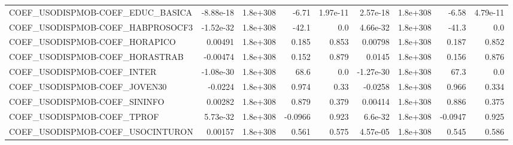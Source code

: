 \begin{tabular}{lrrrrrrrr}
COEF\_USODISPMOB-COEF\_EDUC\_BASICA  &   -8.88e-18 &     1.8e+308 &     -6.71 & 1.97e-11 &   2.57e-18 &    1.8e+308 &        -6.58 &      4.79e-11 \\
COEF\_USODISPMOB-COEF\_HABPROSOCF3  &   -1.52e-32 &     1.8e+308 &     -42.1 &      0.0 &   4.66e-32 &    1.8e+308 &        -41.3 &           0.0 \\
COEF\_USODISPMOB-COEF\_HORAPICO     &     0.00491 &     1.8e+308 &     0.185 &    0.853 &    0.00798 &    1.8e+308 &        0.187 &         0.852 \\
COEF\_USODISPMOB-COEF\_HORASTRAB    &    -0.00474 &     1.8e+308 &     0.152 &    0.879 &     0.0145 &    1.8e+308 &        0.156 &         0.876 \\
COEF\_USODISPMOB-COEF\_INTER        &   -1.08e-30 &     1.8e+308 &      68.6 &      0.0 &  -1.27e-30 &    1.8e+308 &         67.3 &           0.0 \\
COEF\_USODISPMOB-COEF\_JOVEN30      &     -0.0224 &     1.8e+308 &     0.974 &     0.33 &    -0.0258 &    1.8e+308 &        0.966 &         0.334 \\
COEF\_USODISPMOB-COEF\_SININFO      &     0.00282 &     1.8e+308 &     0.879 &    0.379 &    0.00414 &    1.8e+308 &        0.886 &         0.375 \\
COEF\_USODISPMOB-COEF\_TPROF        &    5.73e-32 &     1.8e+308 &   -0.0966 &    0.923 &    6.6e-32 &    1.8e+308 &      -0.0947 &         0.925 \\
COEF\_USODISPMOB-COEF\_USOCINTURON  &     0.00157 &     1.8e+308 &     0.561 &    0.575 &   4.57e-05 &    1.8e+308 &        0.545 &         0.586 \\
\bottomrule
\end{tabular}

